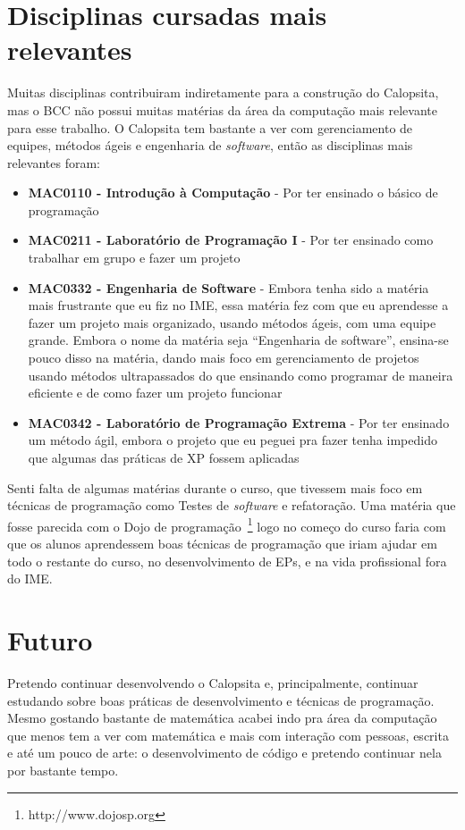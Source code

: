 \documentclass[titlepage,a4paper]{article}
\newcommand{\software}{\textit{software}}
\newcommand{\calopsita}{Calopsita}
\begin{document}
\section{Disciplinas cursadas mais relevantes}

Muitas disciplinas contribuiram indiretamente para a construção do \calopsita{}, mas o BCC não possui muitas matérias da área da computação mais relevante para esse trabalho. O \calopsita{} tem bastante a ver com gerenciamento de equipes, métodos ágeis e engenharia de \software{}, então as disciplinas mais relevantes foram:

\begin{itemize}
	\item{\textbf{MAC0110 - Introdução à Computação} - Por ter ensinado o básico de programação}
	\item{\textbf{MAC0211 - Laboratório de Programação I} - Por ter ensinado como trabalhar em grupo e fazer um projeto}
	\item{\textbf{MAC0332 - Engenharia de Software} - Embora tenha sido a matéria mais frustrante que eu fiz no IME, essa matéria fez com que eu aprendesse a fazer um projeto mais organizado, usando métodos ágeis, com uma equipe grande. Embora o nome da matéria seja ``Engenharia de software'', ensina-se pouco disso na matéria, dando mais foco em gerenciamento de projetos usando métodos ultrapassados do que ensinando como programar de maneira eficiente e de como fazer um projeto funcionar}
	\item{\textbf{MAC0342 - Laboratório de Programação Extrema } - Por ter ensinado um método ágil, embora o projeto que eu peguei pra fazer tenha impedido que algumas das práticas de XP fossem aplicadas}
\end{itemize}

Senti falta de algumas matérias durante o curso, que tivessem mais foco em técnicas de programação como Testes de \software{} e refatoração. Uma matéria que fosse parecida com o Dojo de programação~\footnote{http://www.dojosp.org} logo no começo do curso faria com que os alunos aprendessem boas técnicas de programação que iriam ajudar em todo o restante do curso, no desenvolvimento de EPs, e na vida profissional fora do IME.

\section{Futuro}

Pretendo continuar desenvolvendo o \calopsita{} e, principalmente, continuar estudando sobre boas práticas de desenvolvimento e técnicas de programação. Mesmo gostando bastante de matemática acabei indo pra área da computação que menos tem a ver com matemática e mais com interação com pessoas, escrita e até um pouco de arte: o desenvolvimento de código e pretendo continuar nela por bastante tempo.
\end{document}

